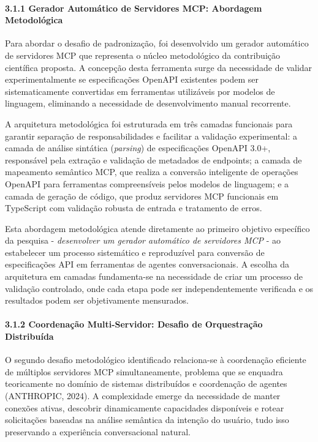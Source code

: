 \documentclass[
]{article}
\begin{document}
\paragraph{3.1.1 Gerador Automático de Servidores MCP: Abordagem
Metodológica}\label{gerador-automuxe1tico-de-servidores-mcp-abordagem-metodoluxf3gica}

Para abordar o desafio de padronização, foi desenvolvido um gerador
automático de servidores MCP que representa o núcleo metodológico da
contribuição científica proposta. A concepção desta ferramenta surge da
necessidade de validar experimentalmente se especificações OpenAPI
existentes podem ser sistematicamente convertidas em ferramentas
utilizáveis por modelos de linguagem, eliminando a necessidade de
desenvolvimento manual recorrente.

A arquitetura metodológica foi estruturada em três camadas funcionais
para garantir separação de responsabilidades e facilitar a validação
experimental: a camada de análise sintática (\emph{parsing}) de
especificações OpenAPI 3.0+, responsável pela extração e validação de
metadados de endpoints; a camada de mapeamento semântico MCP, que
realiza a conversão inteligente de operações OpenAPI para ferramentas
compreensíveis pelos modelos de linguagem; e a camada de geração de
código, que produz servidores MCP funcionais em TypeScript com validação
robusta de entrada e tratamento de erros.

Esta abordagem metodológica atende diretamente ao primeiro objetivo
específico da pesquisa - \emph{desenvolver um gerador automático de
servidores MCP} - ao estabelecer um processo sistemático e reproduzível
para conversão de especificações API em ferramentas de agentes
conversacionais. A escolha da arquitetura em camadas fundamenta-se na
necessidade de criar um processo de validação controlado, onde cada
etapa pode ser independentemente verificada e os resultados podem ser
objetivamente mensurados.

\paragraph{3.1.2 Coordenação Multi-Servidor: Desafio de Orquestração
Distribuída}\label{coordenauxe7uxe3o-multi-servidor-desafio-de-orquestrauxe7uxe3o-distribuuxedda}

O segundo desafio metodológico identificado relaciona-se à coordenação
eficiente de múltiplos servidores MCP simultaneamente, problema que se
enquadra teoricamente no domínio de sistemas distribuídos e coordenação
de agentes (ANTHROPIC, 2024). A complexidade emerge da necessidade de
manter conexões ativas, descobrir dinamicamente capacidades disponíveis
e rotear solicitações baseadas na análise semântica da intenção do
usuário, tudo isso preservando a experiência conversacional natural.
\end{document}

